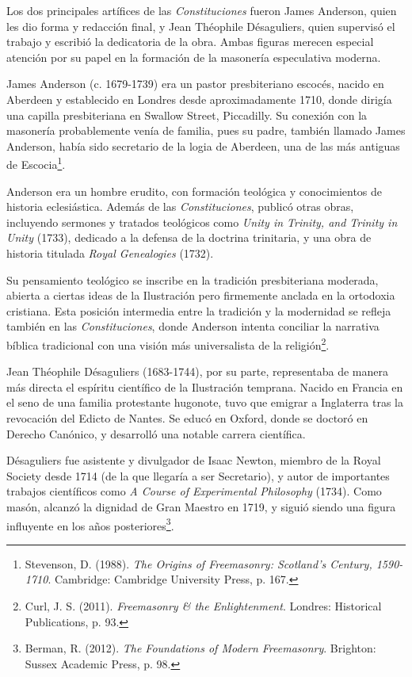 \documentclass[a4paper,12pt,twoside]{book}
\begin{document}
Los dos principales artífices de las \textit{Constituciones} fueron James Anderson, quien les dio forma y redacción final, y Jean Théophile Désaguliers, quien supervisó el trabajo y escribió la dedicatoria de la obra. Ambas figuras merecen especial atención por su papel en la formación de la masonería especulativa moderna.

James Anderson (c. 1679-1739) era un pastor presbiteriano escocés, nacido en Aberdeen y establecido en Londres desde aproximadamente 1710, donde dirigía una capilla presbiteriana en Swallow Street, Piccadilly. Su conexión con la masonería probablemente venía de familia, pues su padre, también llamado James Anderson, había sido secretario de la logia de Aberdeen, una de las más antiguas de Escocia\footnote{Stevenson, D. (1988). \textit{The Origins of Freemasonry: Scotland's Century, 1590-1710}. Cambridge: Cambridge University Press, p. 167.}.

Anderson era un hombre erudito, con formación teológica y conocimientos de historia eclesiástica. Además de las \textit{Constituciones}, publicó otras obras, incluyendo sermones y tratados teológicos como \textit{Unity in Trinity, and Trinity in Unity} (1733), dedicado a la defensa de la doctrina trinitaria, y una obra de historia titulada \textit{Royal Genealogies} (1732).

Su pensamiento teológico se inscribe en la tradición presbiteriana moderada, abierta a ciertas ideas de la Ilustración pero firmemente anclada en la ortodoxia cristiana. Esta posición intermedia entre la tradición y la modernidad se refleja también en las \textit{Constituciones}, donde Anderson intenta conciliar la narrativa bíblica tradicional con una visión más universalista de la religión\footnote{Curl, J. S. (2011). \textit{Freemasonry \& the Enlightenment}. Londres: Historical Publications, p. 93.}.

Jean Théophile Désaguliers (1683-1744), por su parte, representaba de manera más directa el espíritu científico de la Ilustración temprana. Nacido en Francia en el seno de una familia protestante hugonote, tuvo que emigrar a Inglaterra tras la revocación del Edicto de Nantes. Se educó en Oxford, donde se doctoró en Derecho Canónico, y desarrolló una notable carrera científica.

Désaguliers fue asistente y divulgador de Isaac Newton, miembro de la Royal Society desde 1714 (de la que llegaría a ser Secretario), y autor de importantes trabajos científicos como \textit{A Course of Experimental Philosophy} (1734). Como masón, alcanzó la dignidad de Gran Maestro en 1719, y siguió siendo una figura influyente en los años posteriores\footnote{Berman, R. (2012). \textit{The Foundations of Modern Freemasonry}. Brighton: Sussex Academic Press, p. 98.}.
\end{document}
